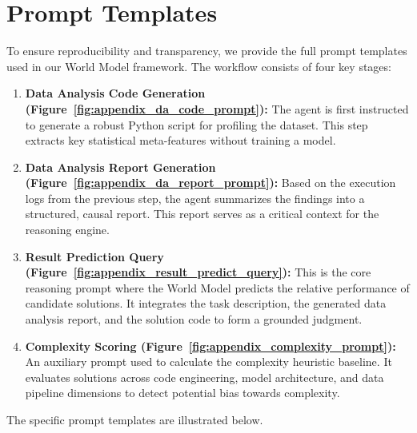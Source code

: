 \section{Prompt Templates}
\label{appendix:prompt_templates}

To ensure reproducibility and transparency, we provide the full prompt templates used in our World Model framework. The workflow consists of four key stages:

\begin{enumerate}
    \item \textbf{Data Analysis Code Generation (Figure~\ref{fig:appendix_da_code_prompt}):} The agent is first instructed to generate a robust Python script for profiling the dataset. This step extracts key statistical meta-features without training a model.
    \item \textbf{Data Analysis Report Generation (Figure~\ref{fig:appendix_da_report_prompt}):} Based on the execution logs from the previous step, the agent summarizes the findings into a structured, causal report. This report serves as a critical context for the reasoning engine.
    \item \textbf{Result Prediction Query (Figure~\ref{fig:appendix_result_predict_query}):} This is the core reasoning prompt where the World Model predicts the relative performance of candidate solutions. It integrates the task description, the generated data analysis report, and the solution code to form a grounded judgment.
    \item \textbf{Complexity Scoring (Figure~\ref{fig:appendix_complexity_prompt}):} An auxiliary prompt used to calculate the complexity heuristic baseline. It evaluates solutions across code engineering, model architecture, and data pipeline dimensions to detect potential bias towards complexity.
\end{enumerate}

The specific prompt templates are illustrated below.


\onecolumn







